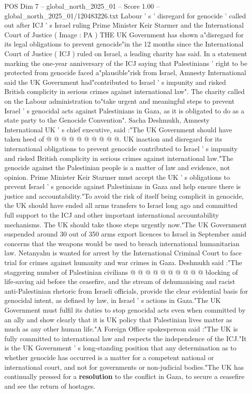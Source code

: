 \begin{textsample}{POS Dim 7 – global\_north\_2025\_01 – Score 1.00 – global\_north\_2025\_01/120483226.txt}  \label{ex:f7_pos_399}
Labour ' s ' disregard for genocide ' called out after ICJ ' s Israel ruling Prime Minister Keir Starmer and the International Court of Justice ( Image : PA ) THE UK Government has shown a"disregard for its legal obligations to prevent genocide"in the 12 months since the International Court of Justice ( ICJ ) ruled on Israel, a leading charity has said.
In a statement marking the one-year anniversary of the ICJ saying that Palestinians ' right to be protected from genocide faced a"plausible"risk from Israel, Amnesty International said the UK Government had"contributed to Israel ' s impunity and risked British complicity in serious crimes against international law".
The charity called on the Labour administration to"take urgent and meaningful steps to prevent Israel ' s genocidal acts against Palestinians in Gaza, as it is obligated to do as a state party to the Genocide Convention".
Sacha Deshmukh, Amnesty International UK ' s chief executive, said :"The UK Government should have taken heed of @ @ @ @ @ @ @ @ @ @.
UK inaction and disregard for its international obligations to prevent genocide contributed to Israel ' s impunity and risked British complicity in serious crimes against international law."The genocide against the Palestinian people is a matter of law and evidence, not opinion.
Prime Minister Keir Starmer must accept the UK ' s obligations to prevent Israel ' s genocide against Palestinians in Gaza and help ensure there is justice and accountability."To avoid the risk of itself being complicit in genocide, the UK should have ended all arms transfers to Israel long ago and committed full support to the ICJ and other important international accountability mechanisms.
The UK should take those steps urgently now."The UK Government suspended around 30 out of 350 arms export licences to Israel in September amid concerns that the weapons would be used to breach international humanitarian law.
Netanyahu is wanted for arrest by the International Criminal Court to face trial for crimes against humanity and war crimes in Gaza.
Deshmukh said :"The staggering number of Palestinian civilians @ @ @ @ @ @ @ @ @ @ blocking of life-saving aid before the ceasefire, and the stream of dehumanising and racist anti-Palestinian rhetoric from Israeli officials, provide the clear evidential basis for genocidal intent, as defined by law, in Israel ' s actions in Gaza."The UK Government must fulfil its duties to stop genocidal acts even when committed by an ally and show clearly that it is UK policy that Palestinian lives matter as much as any other human life."A Foreign Office spokesperson said :"The UK is fully committed to international law and respects the independence of the ICJ."It is the UK Government ' s long-standing position that any determination as to whether genocide has occurred is a matter for a competent national or international court, and not for governments or non-judicial bodies."The UK has continually pressed for a \textbf{resolution} to the conflict in Gaza, to secure a ceasefire and see the return of hostages.

\end{textsample}
